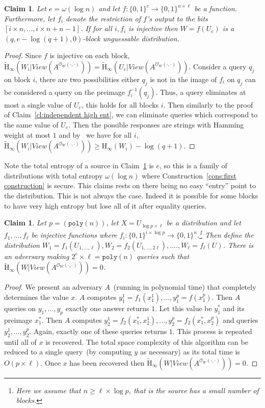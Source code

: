 \documentclass[11pt]{article}
\newcommand{\clref}[1]{\mbox{Claim~\ref{#1}}}
\newcommand{\consref}[1]{\mbox{Construction~\ref{#1}}}
\newcommand{\zo}{\ensuremath{\{0, 1\}}}
\newcommand{\poly}{\ensuremath{\mathtt{poly}}\xspace}
\newcommand{\Hoo}{\mathrm{H}_\infty}
\newcommand{\Hav}{\tilde{\mathrm{H}}_\infty}
\newtheorem{claim}[theorem]{Claim}
\begin{document}
\begin{claim}
\label{cl:each block from single seed}
Let $e =\omega(\log n)$ and let $f:\zo^e \rightarrow \zo^{n\times \ell}$ be a function.  Furthermore, let $f_i$ denote the restriction of $f$'s output to the bits $[i\times n,..., i\times n+n-1]$.  If for all $i, f_i$ is injective then $W = f(U_e)$ is a $( q, e - \log (q+1), 0)$-block unguessable distribution.
\end{claim}
\begin{proof}
Since $f$ is injective on each block, $\Hav(W_i | View(A^{\mathcal{O}_{W}(\cdot, \cdot)})) = \Hav(U_e | View(A^{\mathcal{O}_{W}(\cdot, \cdot)}))$.  Consider a query $q_j$ on block $i$, there are two possibilities either $q_j$ is not in the image of $f_i$ on $q_j$ can be considered a query on the preimage $f_i^{-1}(q_j)$.  Thus, a query eliminates at most a single value of $U_e$, this holds for all blocks $i$.  Then similarly to the proof of \clref{cl:independent high ent}, we can eliminate queries which correspond to the same value of $U_e$.  Then the possible responses are strings with Hamming weight at most $1$ and by~\cite[Lemma 2.2]{DBLP:journals/siamcomp/DodisORS08} we have for all $i$, $\Hav(W_i | View(A^{\mathcal{O}_{W}(\cdot, \cdot)})) \geq \Hoo(W_i) -\log (q+1)$.
\end{proof}

Note the total entropy of a source in \clref{cl:each block from single seed} is $e$, so this is a family of distributions with total entropy $\omega(\log n)$ where \consref{cons:first construction} is secure.  This claims rests on there being no easy ``entry'' point to the distribution.  This is not always the case.  Indeed it is possible for some blocks to have very high entropy but lose all of it after equality queries.

\begin{claim}
Let $p = (\poly(n))$, let $X = U_{\log p\times \ell}$ be a distribution and let $f_1,..., f_{\ell}$ be injective functions where $f_i:\zo^{i\times \log p}\rightarrow \zo^n$.\footnote{Here we assume that $n\ge \ell \times \log p$, that is the source has a small number of blocks.}  Then define the distribution $W_1 = f_1(U_{1,...,\ell}), W_2 = f_2(U_{1,..., 2\ell}),...., W_\ell = f_\ell(U)$.  There is an adversary making $2^e\times \ell = \poly(n)$ queries such that $\Hav(W | View(A^{\mathcal{O}_W(\cdot, \cdot)})) = 0$.
\end{claim}
\begin{proof}
We present an adversary $A$~(running in polynomial time) that completely determines the value $x$.  $A$ computes $y_1^1 = f_1(x_1^1),..., y_1^p = f(x_1^p)$.  Then $A$ queries on $y_1,..., y_p$ exactly one answer returns $1$.  Let this value be $y_1^*$ and its preimage $x_1^*$.  Then $A$ computes $y_2^1 = f_2(x_1^*,x_2^1), ..., y_2^p= f_2(x_1^*, x_2^p)$ and queries $y_2^1,..., y_2^p$.  Again, exactly one of these queries returns $1$.  This process is repeated until all of $x$ is recovered.  The total space complexity of this algorithm can be reduced to a single query~(by computing $y$ as necessary) as its total time is $O(p\times \ell)$.  Once $x$ has been recovered then $\Hav(W | View(A^{\mathcal{O}_W(\cdot, \cdot)})) = 0$.
\end{proof}
\end{document}
